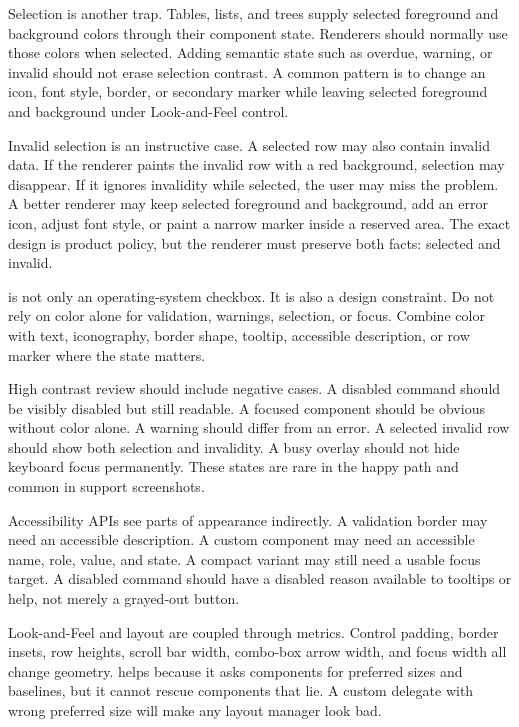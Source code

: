 Selection is another trap. Tables, lists, and trees supply selected foreground and background colors through their component state. Renderers should normally use those colors when selected. Adding semantic state such as overdue, warning, or invalid should not erase selection contrast. A common pattern is to change an icon, font style, border, or secondary marker while leaving selected foreground and background under Look-and-Feel control.

Invalid selection is an instructive case. A selected row may also contain invalid data. If the renderer paints the invalid row with a red background, selection may disappear. If it ignores invalidity while selected, the user may miss the problem. A better renderer may keep selected foreground and background, add an error icon, adjust font style, or paint a narrow marker inside a reserved area. The exact design is product policy, but the renderer must preserve both facts: selected and invalid.

 is not only an operating-system checkbox. It is also a design constraint. Do not rely on color alone for validation, warnings, selection, or focus. Combine color with text, iconography, border shape, tooltip, accessible description, or row marker where the state matters.

High contrast review should include negative cases. A disabled command should be visibly disabled but still readable. A focused component should be obvious without color alone. A warning should differ from an error. A selected invalid row should show both selection and invalidity. A busy overlay should not hide keyboard focus permanently. These states are rare in the happy path and common in support screenshots.

Accessibility APIs see parts of appearance indirectly. A validation border may need an accessible description. A custom component may need an accessible name, role, value, and state. A compact variant may still need a usable focus target. A disabled command should have a disabled reason available to tooltips or help, not merely a grayed-out button.

Look-and-Feel and layout are coupled through metrics. Control padding, border insets, row heights, scroll bar width, combo-box arrow width, and focus width all change geometry. \miglayout{} helps because it asks components for preferred sizes and baselines, but it cannot rescue components that lie. A custom delegate with wrong preferred size will make any layout manager look bad.

